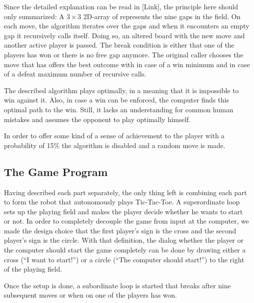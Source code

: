 \documentclass{sig-alternate-05-2015}
\begin{document}
Since the detailed explanation can be read in [Link], the principle here should only summarized: A $3\times 3$ 2D-array of represents the nine gaps in the field. On each move, the algorithm iterates over the gaps and when it encounters an empty gap it recursively calls itself. Doing so, an altered board with the new move and another active player is passed. The break condition is either that one of the players has won or there is no free gap anymore. The original caller chooses the move that has offers the best outcome with in case of a win minimum and in case of a defeat maximum number of recursive calls.

The described algorithm plays optimally, in a meaning that it is impossible to win against it. Also, in case a win can be enforced, the computer finds this optimal path to the win. Still, it lacks an understanding for common human mistakes and assumes the opponent to play optimally himself.

In order to offer some kind of a sense of achievement to the player with a probability of 15\% the algorithm is disabled and a random move is made.
\subsection{The Game Program}
Having described each part separately, the only thing left is combining each part to form the robot that autonomously plays Tic-Tac-Toe. A superordinate loop sets up the playing field and makes the player decide whether he wants to start or not. In order to completely decouple the game from input at the computer, we made the design choice that the first player's sign is the cross and the second player's sign is the circle. With that definition, the dialog whether the player or the computer should start the game completely can be done by drawing either a cross (``I want to start!'') or a circle (``The computer should start!'') to the right of the playing field.

Once the setup is done, a subordinate loop is started that breaks after nine subsequent moves or when on one of the players has won.
\end{document}
